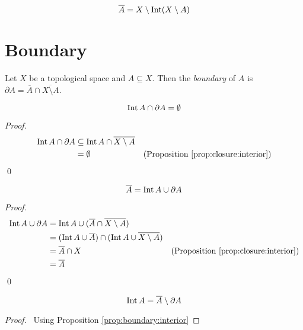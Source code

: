 \begin{cor}
  \[ \overline{A} = X \setminus \operatorname{Int} (X \setminus A) \]
\end{cor}

\section{Boundary}

\begin{df}[Boundary]
  Let $X$ be a topological space and $A \subseteq X$. Then the \emph{boundary} of $A$ is $\partial A = \overline{A} \cap \overline{X \setminus A}$.
\end{df}

\begin{prop}
  \label{prop:boundary:interior}
  \[ \operatorname{Int} A \cap \partial A = \emptyset \]
\end{prop}

\begin{proof}
  \pf\
  \begin{align*}
    \operatorname{Int} A \cap \partial A & \subseteq \operatorname{Int} A \cap \overline{X \setminus A} \\
    & = \emptyset & (\text{Proposition \ref{prop:closure:interior}})
  \end{align*}
  \qed
\end{proof}

\begin{prop}
  \label{prop:boundary:closure}
  \[ \overline{A} = \operatorname{Int} A \cup \partial A \]
\end{prop}

\begin{proof}
  \pf
  \begin{align*}
    \operatorname{Int} A \cup \partial A & = \operatorname{Int} A \cup (\overline{A} \cap \overline{X \setminus A}) \\
    & = (\operatorname{Int} A \cup \overline{A}) \cap (\operatorname{Int} A \cup \overline{X \setminus A}) \\
    & = \overline{A} \cap X & (\text{Proposition \ref{prop:closure:interior}})\\
    & = \overline{A}
  \end{align*}
  \qed
\end{proof}

\begin{cor}
  \label{cor:boundary:interior}
  \[ \operatorname{Int} A = \overline{A} \setminus \partial A \]
\end{cor}

\begin{proof}
  \pf\ Using Proposition \ref{prop:boundary:interior}
\end{proof}

